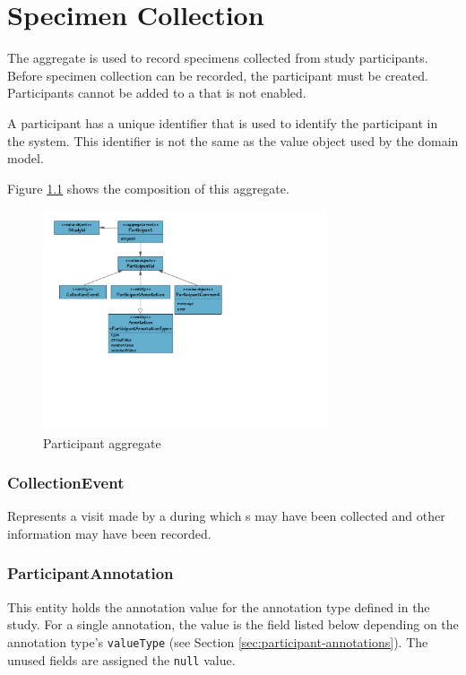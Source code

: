 \chapter{Specimen Collection}

The  aggregate is used to record specimens collected
from study participants. Before specimen collection can be recorded, the
participant must be created. Participants cannot be added to a
 that is not enabled.

A participant has a unique identifier that is used to identify the participant
in the system. This identifier is not the same as the
 value object used by the domain model.

Figure \ref{fig:participant-aggregate} shows the composition of this aggregate.

\begin{figure}[H]
  \includegraphics[trim={10mm 75mm 102mm 10mm}, clip,
    width=0.75\textwidth]{images/participant-aggregate}
  \caption{Participant aggregate}
  \label{fig:participant-aggregate}
\end{figure}

\subsection*{CollectionEvent}
Represents a visit made by a  during which
s may have been collected and other information may have
been recorded.

\subsection*{ParticipantAnnotation}
This entity holds the annotation value for the annotation type defined in the
study. For a single annotation, the value is the field listed below depending
on the annotation type's \texttt{valueType} (see Section
\ref{sec:participant-annotations}). The unused fields are assigned the
\texttt{null} value.

